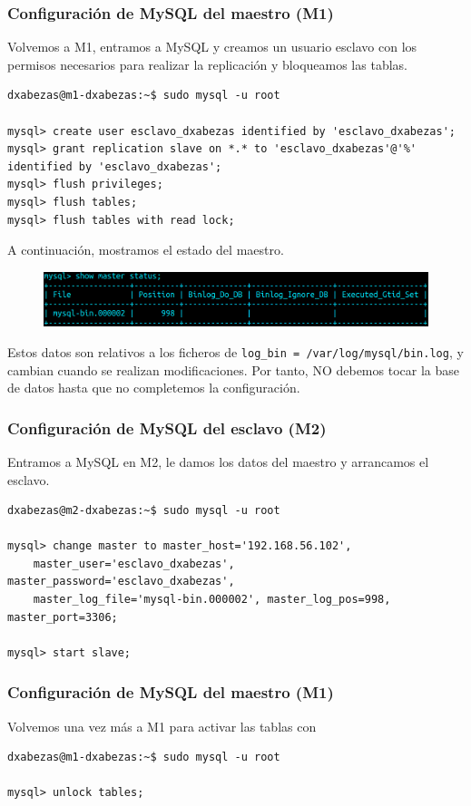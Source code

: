 \documentclass{article}
\begin{document}
\subsubsection*{Configuración de MySQL del maestro (M1)}

Volvemos a M1, entramos a MySQL y creamos un usuario esclavo con los permisos necesarios para realizar la replicación y
bloqueamos las tablas.
\begin{Verbatim}
dxabezas@m1-dxabezas:~$ sudo mysql -u root

mysql> create user esclavo_dxabezas identified by 'esclavo_dxabezas';
mysql> grant replication slave on *.* to 'esclavo_dxabezas'@'%' identified by 'esclavo_dxabezas';
mysql> flush privileges;
mysql> flush tables;
mysql> flush tables with read lock;
\end{Verbatim}

A continuación, mostramos el estado del maestro.
\begin{figure}[H]
	\centering
	\includegraphics[width=150mm]{imgs/master-status}
\end{figure}
Estos datos son relativos a los ficheros de \texttt{log\_bin = /var/log/mysql/bin.log}, y cambian cuando
se realizan modificaciones. Por tanto, NO debemos tocar la base de datos hasta que no completemos la configuración.

\subsubsection*{Configuración de MySQL del esclavo (M2)}

Entramos a MySQL en M2, le damos los datos del maestro y arrancamos el esclavo.
\begin{Verbatim}[tabsize=7]
dxabezas@m2-dxabezas:~$ sudo mysql -u root

mysql> change master to master_host='192.168.56.102',
	master_user='esclavo_dxabezas', master_password='esclavo_dxabezas',
	master_log_file='mysql-bin.000002', master_log_pos=998, master_port=3306;
	
mysql> start slave;
\end{Verbatim}

\subsubsection*{Configuración de MySQL del maestro (M1)}
Volvemos una vez más a M1 para activar las tablas con
\begin{Verbatim}
dxabezas@m1-dxabezas:~$ sudo mysql -u root

mysql> unlock tables;
\end{Verbatim}
\end{document}
